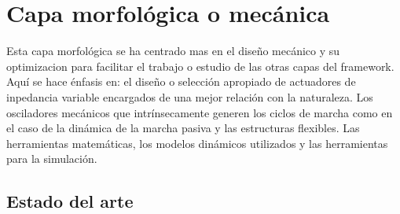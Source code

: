 \documentclass[10pt,onecolumn,twoside,letterpaper]{article}
\begin{document}
\section{Capa morfol\'ogica o mec\'anica}
Esta capa morfol\'ogica se ha centrado mas en el dise\~no mec\'anico y su optimizacion para facilitar el trabajo o estudio de las otras capas del framework. Aqu\'i se hace \'enfasis en: el dise\~no o selecci\'on apropiado de actuadores de inpedancia variable encargados de una mejor relaci\'on con la naturaleza. Los osciladores mec\'anicos que intr\'insecamente generen los ciclos de marcha como en el caso de la din\'amica de la marcha pasiva y las estructuras flexibles. Las herramientas matem\'aticas, los modelos din\'amicos utilizados y las herramientas para la simulaci\'on.
\subsection{Estado del arte}
\end{document}
